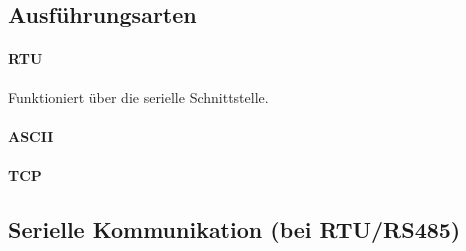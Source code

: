 \subsection{Ausführungsarten}
\paragraph{RTU}
Funktioniert über die serielle Schnittstelle.
\paragraph{ASCII}
\paragraph{TCP}

\subsection{Serielle Kommunikation (bei RTU/RS485)}


